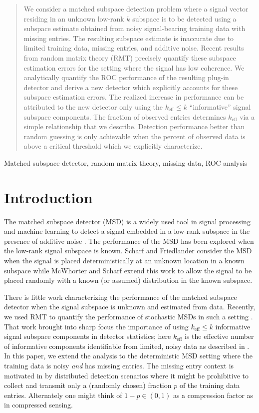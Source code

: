 \begin{abstract}
We consider a matched subspace detection problem where a signal vector residing in an unknown low-rank $k$ subspace is to be detected using a subspace estimate obtained from noisy signal-bearing training data with missing entries. The resulting subspace estimate is inaccurate due to limited training data, missing entries, and additive noise. Recent results from random matrix theory (RMT) precisely quantify these subspace estimation errors for the setting where the signal has low coherence. We analytically quantify the ROC performance of the resulting plug-in detector and derive a new detector which explicitly accounts for these subspace estimation errors. The realized increase in performance can be attributed to the new detector only using the $k_\text{eff}\leq k$ ``informative'' signal subspace components. The fraction of observed entries determines $k_\text{eff}$ via a simple relationship that we describe. Detection performance better than random guessing is only achievable when the percent of observed data is above a critical threshold which we explicitly characterize.
\end{abstract}
%
\begin{keywords}
Matched subspace detector, random matrix theory, missing data, ROC analysis
\end{keywords}
%
\section{Introduction}\label{sec:intro}

The matched subspace detector (MSD) is a widely used tool in signal processing and machine learning to detect a signal embedded in a low-rank subspace in the presence of additive noise \cite{scharf1994matched,jin2005cfar,mcwhorter2003matched}. The performance of the MSD has been explored when the low-rank signal subspace is known. Scharf and Friedlander \cite{scharf1994matched} consider the MSD when the signal is placed deterministically at an unknown location in a known subspace while McWhorter and Scharf \cite{mcwhorter2003matched} extend this work to allow the signal to be placed randomly with a known (or assumed) distribution in the known subspace.

There is little work characterizing the performance of the matched subspace detector when the signal subspace is unknown and estimated from data. Recently, we used RMT to quantify the performance of stochastic MSDs in such a setting  \cite{asendorf2011msd}. That work brought into sharp focus the importance of using $k_\text{eff}\leq k$ informative signal subspace components in detector statistics; here $k_{\text{eff}}$ is the effective number of informative components identifiable from limited, noisy data as described in \cite{nadakuditi2008sample}. In this paper, we extend the analysis to the deterministic MSD setting where the training data is noisy \textit{and} has missing entries. The missing entry context is motivated in \cite{balzano2010high} by distributed detection scenarios where it might be prohibitive to collect and transmit only a (randomly chosen) fraction $p$ of the training data entries. Alternately one might think of $1-p \in (0,1)$ as a compression factor as in compressed sensing.

